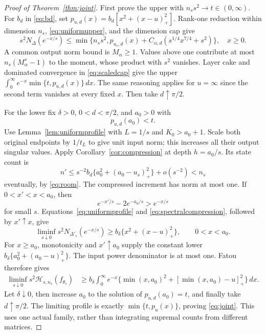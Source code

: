 \documentclass[11pt]{article}
\numberwithin{equation}{section}
\newcommand{\cH}{\mathcal H}
\begin{document}
\begin{proof}[Proof of Theorem~\ref{thm:joint}]
First prove the upper with $n_s s^2\to t\in(0,\infty)$.
For $b_d$ in \eqref{eq:bd}, set
$p_{u,d}(x)=b_d[x^2+(x-u)_+^2]$.
Rank-one reduction within dimension $n_s$,
\eqref{eq:uniformupper}, and the dimension cap give
\begin{equation}\label{eq:scaledcap}
 s^2N_\Delta(e^{-x/s})\le
 \min\{n_s s^2,p_{u_s,d}(x)
                  +C_{\alpha,d}(s^{1/4}x^{7/4}+s^2)\},\quad x\ge0.
\end{equation}
A common output norm bound is $M_\alpha\ge1$.
Values above one contribute at most $n_s(M_\alpha^s-1)$ to the
moment, whose product with $s^2$ vanishes. Layer cake and dominated
convergence in \eqref{eq:scaledcap} give the upper
$\int_0^\infty e^{-x}\min\{t,p_{u,d}(x)\}\,dx$.
The same reasoning applies for $u=\infty$ since the second term
vanishes at every fixed $x$. Then take $d\uparrow\pi/2$.

For the lower fix $\delta>0$, $0<d<\pi/2$, and $a_0>0$ with
\begin{equation}\label{eq:room}
 p_{u,d}(a_0)<t.
\end{equation}
Use Lemma~\ref{lem:uniformprofile} with $L=1/s$ and $K_0>a_0+1$.
Scale both original endpoints by $1/t_L$ to give unit input norm;
this increases all their output singular values. Apply
Corollary~\ref{cor:compression} at depth $h=a_0/s$. Its state count is
\[
 n'\le s^{-2}b_d\{a_0^2+(a_0-u_s)_+^2\}+o(s^{-2})<n_s
\]
eventually, by \eqref{eq:room}. The compressed increment has norm
at most one. If $0<x'<x<a_0$, then
\[
 e^{-x'/s}-2e^{-a_0/s}>e^{-x/s}
\]
for small $s$. Equations~\eqref{eq:uniformprofile} and
\eqref{eq:spectralcompression}, followed by $x'\uparrow x$, give
\begin{equation}\label{eq:compressedprofile}
 \liminf_{s\downarrow0}s^2N_{\Delta'_s}(e^{-x/s})
       \ge b_\delta\{x^2+(x-u)_+^2\},\qquad 0<x<a_0.
\end{equation}
For $x\ge a_0$, monotonicity and $x'\uparrow a_0$ supply the constant
lower $b_\delta\{a_0^2+(a_0-u)_+^2\}$.
The input power denominator is at most one. Fatou therefore gives
\begin{align*}
 \liminf_{s\downarrow0}s^2\cH_{s,n_s}(f_{\theta_s})
 &\ge b_\delta\int_0^\infty e^{-x}
 \{\min(x,a_0)^2+[\min(x,a_0)-u]_+^2\}\,dx.
\end{align*}
Let $\delta\downarrow0$, then increase $a_0$ to the solution of
$p_{u,d}(a_0)=t$, and finally take $d\uparrow\pi/2$.
The limiting profile is exactly $\min\{t,p_u(x)\}$, proving
\eqref{eq:joint}. This uses one actual family, rather than integrating
supremal counts from different matrices.


\end{proof}
\end{document}

